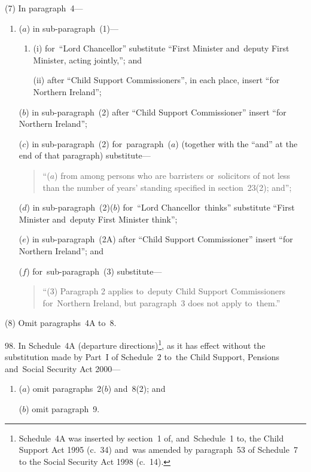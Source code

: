 \documentclass[12pt,a4paper]{article}
\begin{document}
(7) In paragraph~4—
\begin{enumerate}\item[]
($a$) in sub-paragraph~(1)—
\begin{enumerate}\item[]
(i) for~“Lord Chancellor” substitute “First Minister and~deputy First Minister, acting jointly,”; and

(ii) after “Child Support Commissioners”, in each place, insert “for Northern Ireland”;
\end{enumerate}

($b$) in sub-paragraph~(2) after “Child Support Commissioner” insert “for Northern Ireland”;

($c$) in sub-paragraph~(2) for~paragraph~($a$)  (together with the “and” at the end of that paragraph) substitute—
\begin{quotation}
“($a$) from among persons who are barristers or~solicitors of not less than the number of years’ standing specified in section~23(2); and”;
\end{quotation}

($d$) in sub-paragraph~(2)($b$)  for~“Lord Chancellor~thinks” substitute “First Minister and~deputy First Minister think”;

($e$) in sub-paragraph~(2A) after “Child Support Commissioner” insert “for Northern Ireland”; and

($f$) for~sub-paragraph~(3) substitute—
\begin{quotation}
“(3) Paragraph 2 applies to~deputy Child Support Commissioners for~Northern Ireland, but paragraph~3 does not apply to~them.”
\end{quotation}
\end{enumerate}

(8) Omit paragraphs~4A to~8.

\medskip

98.  In Schedule~4A (departure directions)\footnote{Schedule~4A was inserted by section~1 of, and~Schedule~1 to, the Child Support Act 1995 (c.~34) and~was amended by paragraph~53 of Schedule~7 to the Social Security Act 1998 (c.~14).}, as it has effect without the substitution made by Part~I of Schedule~2 to~the Child Support, Pensions and~Social Security Act 2000—
\begin{enumerate}\item[]
($a$) omit paragraphs~2($b$)  and~8(2); and

($b$) omit paragraph~9.
\end{enumerate}
\end{document}
